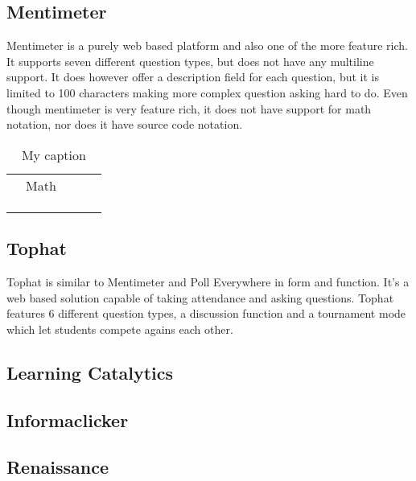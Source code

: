 \subsection{Mentimeter}
Mentimeter is a purely web based platform and also one of the more feature rich. It supports seven different question types, but does not have any multiline support. It does however offer a description field for each question, but it is limited to 100 characters making more complex question asking hard to do. Even though mentimeter is very feature rich, it does not have support for math notation, nor does it have source code notation.  



\begin{table}[]
\centering
\label{my-label}
\begin{tabular}{lllll}
 & Math  &  &  &  \\
 &  &  &  &  \\
 &  &  &  &  \\
 &  &  &  & 
\caption{My caption}
\end{tabular}
\end{table}







\subsection{Tophat}
Tophat is similar to Mentimeter and Poll Everywhere in form and function. It's a web based solution capable of taking attendance and asking questions. Tophat features 6 different question types, a discussion function and a tournament mode which let students compete agains each other.


\subsection{Learning Catalytics}
\subsection{Informaclicker}
\subsection{Renaissance}






